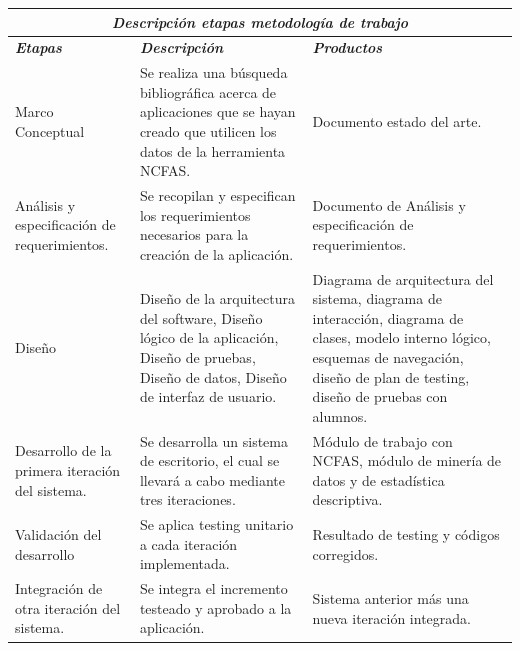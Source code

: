 \documentclass[12pt,letterpaper]{article}
\begin{document}
 

\begin{table}[hbt]
\begin{tabular}{| p{4.5cm} | p{4.5cm} | p{4.5cm} |}
\hline
\multicolumn{3}{|c|}{\textbf{\textit{Descripci\'on etapas metodología de trabajo}}} \\ \hline
\textit{\textbf{Etapas}} & 
\textit{\textbf{Descripción}} &  
\textit{\textbf{Productos}}
\\ \hline 
{Marco Conceptual} & 
{Se realiza una búsqueda bibliográfica acerca de aplicaciones que se hayan creado que utilicen los datos de la herramienta NCFAS.} & 
{Documento estado del arte.} 
\\ \hline
{Análisis y especificación de requerimientos.} & 
{Se recopilan y especifican los requerimientos necesarios para la creación de la aplicación.} & 
{Documento de Análisis y especificación de requerimientos.} 
\\ \hline
{Diseño} & 
{Diseño de la arquitectura del software, Diseño lógico de la aplicación, Diseño de pruebas, Diseño de datos, Diseño de interfaz de usuario.} & 
{Diagrama de arquitectura del sistema, diagrama de interacción, diagrama de clases, modelo interno lógico, esquemas de navegación, diseño de plan de testing, diseño de pruebas con alumnos.}
\\ \hline
{Desarrollo de la primera iteraci\'on del sistema.} & 
{Se desarrolla un sistema de escritorio, el cual se llevará a cabo mediante tres iteraciones. } & 
{Módulo de trabajo con NCFAS,  módulo de minería de datos y de estadística descriptiva.} 
\\ \hline
{Validaci\'on del desarrollo} & 
{Se aplica testing unitario a cada iteración implementada.} & 
{Resultado de testing y códigos corregidos.} 
\\ \hline
{Integración de otra iteración del sistema.} & 
{Se integra el incremento testeado y aprobado a la aplicación.} &
{Sistema anterior más una nueva iteración integrada.}
\\ \hline

\end{tabular} 
\label{Tabla 1}
 \end{table}

\newpage
\clearpage
\end{document}
